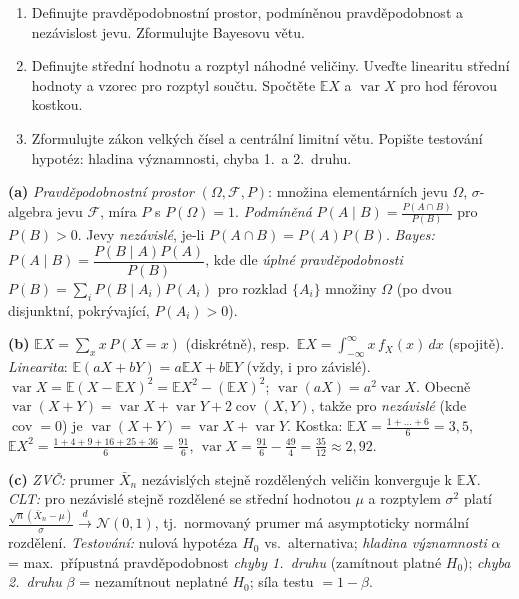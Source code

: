 \begin{zadani}
\begin{enumerate}[label=(\alph*)]
  \item {} Definujte pravděpodobnostní prostor, podmíněnou pravděpodobnost a nezávislost jevu. Zformulujte Bayesovu větu.
  \item {} Definujte střední hodnotu a rozptyl náhodné veličiny. Uveďte linearitu střední hodnoty a vzorec pro rozptyl součtu. Spočtěte $\mathbb{E}X$ a $\operatorname{var}X$ pro hod férovou kostkou.
  \item {} Zformulujte zákon velkých čísel a centrální limitní větu. Popište testování hypotéz: hladina významnosti, chyba 1.\ a 2.\ druhu.
\end{enumerate}
\end{zadani}

\begin{reseni}
\textbf{(a)} \emph{Pravděpodobnostní prostor} $(\Omega,\mathcal{F},P)$: množina elementárních jevu $\Omega$, $\sigma$-algebra jevu $\mathcal{F}$, míra $P$ s $P(\Omega)=1$. \emph{Podmíněná} $P(A\mid B)=\frac{P(A\cap B)}{P(B)}$ pro $P(B)>0$. Jevy \emph{nezávislé}, je-li $P(A\cap B)=P(A)P(B)$. \emph{Bayes:} $P(A\mid B)=\dfrac{P(B\mid A)P(A)}{P(B)}$, kde dle \emph{úplné pravděpodobnosti} $P(B)=\sum_i P(B\mid A_i)P(A_i)$ pro rozklad $\{A_i\}$ množiny $\Omega$ (po dvou disjunktní, pokrývající, $P(A_i)>0$).

\textbf{(b)} $\mathbb{E}X=\sum_x x\,P(X=x)$ (diskrétně), resp.\ $\mathbb{E}X=\int_{-\infty}^{\infty}x\,f_X(x)\,dx$ (spojitě). \emph{Linearita}: $\mathbb{E}(aX+bY)=a\mathbb{E}X+b\mathbb{E}Y$ (vždy, i pro závislé). $\operatorname{var}X=\mathbb{E}(X-\mathbb{E}X)^2=\mathbb{E}X^2-(\mathbb{E}X)^2$; $\operatorname{var}(aX)=a^2\operatorname{var}X$. Obecně $\operatorname{var}(X+Y)=\operatorname{var}X+\operatorname{var}Y+2\operatorname{cov}(X,Y)$, takže pro \emph{nezávislé} (kde $\operatorname{cov}=0$) je $\operatorname{var}(X+Y)=\operatorname{var}X+\operatorname{var}Y$. Kostka: $\mathbb{E}X=\tfrac{1+\dots+6}{6}=3{,}5$, $\mathbb{E}X^2=\tfrac{1+4+9+16+25+36}{6}=\tfrac{91}{6}$, $\operatorname{var}X=\tfrac{91}{6}-\tfrac{49}{4}=\tfrac{35}{12}\approx2{,}92$.

\textbf{(c)} \emph{ZVČ:} prumer $\bar X_n$ nezávislých stejně rozdělených veličin konverguje k $\mathbb{E}X$. \emph{CLT:} pro nezávislé stejně rozdělené se střední hodnotou $\mu$ a rozptylem $\sigma^2$ platí $\frac{\sqrt n(\bar X_n-\mu)}{\sigma}\xrightarrow{d}\mathcal{N}(0,1)$, tj.\ normovaný prumer má asymptoticky normální rozdělení. \emph{Testování:} nulová hypotéza $H_0$ vs.\ alternativa; \emph{hladina významnosti} $\alpha$ = max.\ přípustná pravděpodobnost \emph{chyby 1.\ druhu} (zamítnout platné $H_0$); \emph{chyba 2.\ druhu} $\beta$ = nezamítnout neplatné $H_0$; síla testu $=1-\beta$.
\end{reseni}

